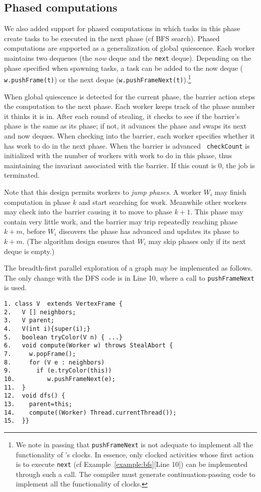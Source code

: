 \subsection{Phased computations}
We also added support for phased computations in which tasks in this
phase create tasks to be executed in the next phase (cf{} BFS search).
Phased computations are supported as a generalization of global
quiescence. Each worker maintains two dequeues (the {\em now} deque
and the {\tt next} deque).  Depending on the phase specified when
spawning tasks, a task can be added to the now deque ({\tt
w.pushFrame(t)}) or the next deque ({\tt w.pushFrameNext(t)}).\footnote{
We note in passing that {\tt pushFrameNext} is not adequate
to implement all the functionality of \Xten{}'s clocks. In essence,
only clocked activities whose first action is to execute 
{\tt next} (cf Example~\ref{example:bfs}[Line 10]) can be implemented
through such a call. The compiler must generate continuation-passing
code to implement all the functionality of clocks.}

When global quiescence is detected for the current phase, the barrier
action steps the computation to the next phase. Each worker keeps
track of the phase number it thinks it is in. After each round of
stealing, it checks to see if the barrier's phase is the same as its
phase; if not, it advances the phase and swaps its next and now
deques. When checking into the barrier, each worker specifies whether
it has work to do in the next phase. When the barrier is advanced {\tt
checkCount} is initialized with the number of workers with work to do in this phase, thus maintaining the
invariant associated with the barrier.  If this count is $0$, the job
is terminated.

Note that this design permits workers to {\em jump phases}. A worker
$W_i$ may finish computation in phase $k$ and start searching for
work. Meanwhile other workers may check into the barrier causing it to
move to phase $k+1$. This phase may contain very little work, and the
barrier may trip repeatedly reaching phase $k+m$, before $W_i$
discovers the phase has advanced and updates its phase to $k+m$. (The
algorithm design ensures that $W_i$ may skip phases only if its next
deque is empty.)


\begin{example} \label{example:bfs-xws}
The breadth-first parallel exploration of a graph may be implemented
as follows. The only change with the DFS code is in Line 10, where a call
to {\tt pushFrameNext} is used.
{\footnotesize
\begin{verbatim}
1. class V  extends VertexFrame {
2.   V [] neighbors;
3.   V parent;
4.   V(int i){super(i);}
5.   boolean tryColor(V n) { ...}
6.   void compute(Worker w) throws StealAbort {
7.     w.popFrame();
8.     for (V e : neighbors) 
9.       if (e.tryColor(this)) 
10.         w.pushFrameNext(e);
11.  }
12.  void dfs() {
13.    parent=this;   
14.    compute((Worker) Thread.currentThread());
15.  }}
\end{verbatim}}
\end{example}
